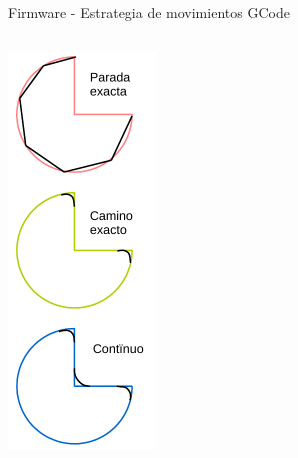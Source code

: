 \documentclass[aspectratio= 43]{beamer}
\begin{document}
\begin{frame}[fragile]{Firmware - Estrategia de movimientos GCode}
\begin{columns}
      \includegraphics[width=0.5\textwidth, left]{./Figures/exact_stop.pdf}
   \end{columns}
\end{frame}
\end{document}
